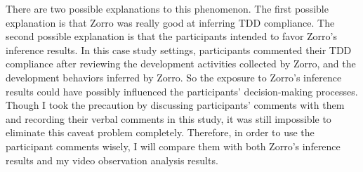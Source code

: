 There are two possible explanations to this phenomenon. The first 
possible explanation is that Zorro was really good at inferring TDD 
compliance. The second possible explanation is that the participants
intended to favor Zorro's inference results. In this case study
settings, participants commented their TDD compliance after reviewing
the development activities collected by Zorro, and the development
behaviors inferred by Zorro. So the exposure to Zorro's inference
results could have possibly influenced the participants' decision-making
processes. Though I took the precaution by discussing participants' 
comments with them and recording their verbal comments in this study, 
it was still impossible to eliminate this caveat problem completely. 
Therefore, in order to use the participant comments wisely, I will 
compare them with both Zorro's inference results and my video observation 
analysis results. 

